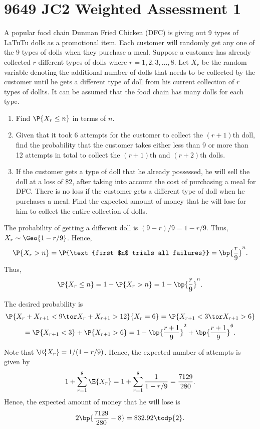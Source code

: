 \section{9649 JC2 Weighted Assessment 1}

\begin{problem}
    A popular food chain Dunman Fried Chicken (DFC) is giving out 9 types of LaTuTu dolls as a promotional item. Each customer will randomly get any one of the 9 types of dolls when they purchase a meal. Suppose a customer has already collected $r$ different types of dolls where $r = 1, 2, 3, \dots, 8$. Let $X_r$ be the random variable denoting the additional number of dolls that needs to be collected by the customer until he gets a different type of doll from his current collection of $r$ types of dollts. It can be assumed that the food chain has many dolls for each type.

    \begin{enumerate}
        \item Find $\P{X_r \leq n}$ in terms of $n$.
        \item Given that it took 6 attempts for the customer to collect the $(r+1)$th doll, find the probability that the customer takes either less than 9 or more than 12 attempts in total to collect the $(r+1)$th and $(r+2)$th dolls.
        \item If the customer gets a type of doll that he already possessed, he will sell the doll at a loss of \$2, after taking into account the cost of purchasing a meal for DFC. There is no loss if the customer gets a different type of doll when he purchases a meal. Find the expected amount of money that he will lose for him to collect the entire collection of dolls.
    \end{enumerate}
\end{problem}
\begin{solution}
    \begin{ppart}
        The probability of getting a different doll is $(9-r)/9 = 1 - r/9$. Thus, $X_r \sim \Geo{1 - r/9}$. Hence, \[\P{X_r > n} = \P{\text{first $n$ trials all failures}} = \bp{\frac{r}9}^n.\] Thus, \[\P{X_r \leq n} = 1 - \P{X_r > n} = 1 - \bp{\frac{r}9}^n.\]
    \end{ppart}
    \begin{ppart}
        The desired probability is
        \begin{gather*}
            \P{X_r + X_{r+1} < 9 \tor X_r + X_{r+1} > 12}{X_r = 6} = \P{X_{r+1} < 3 \tor X_{r+1} > 6}\\
            = \P{X_{r+1} < 3} + \P{X_{r+1} > 6} = 1 - \bp{\frac{r+1}9}^2 + \bp{\frac{r+1}9}^6.
        \end{gather*}
    \end{ppart}
    \begin{ppart}
        Note that $\E{X_r} = 1/(1 - r/9)$. Hence, the expected number of attempts is given by \[1 + \sum_{r = 1}^8 \E{X_r} = 1 + \sum_{r=1}^8 \frac1{1 - r/9} = \frac{7129}{280}.\] Hence, the expected amount of money that he will lose is \[2\bp{\frac{7129}{280} - 8} = \$32.92 \todp{2}.\]
    \end{ppart}
\end{solution}

